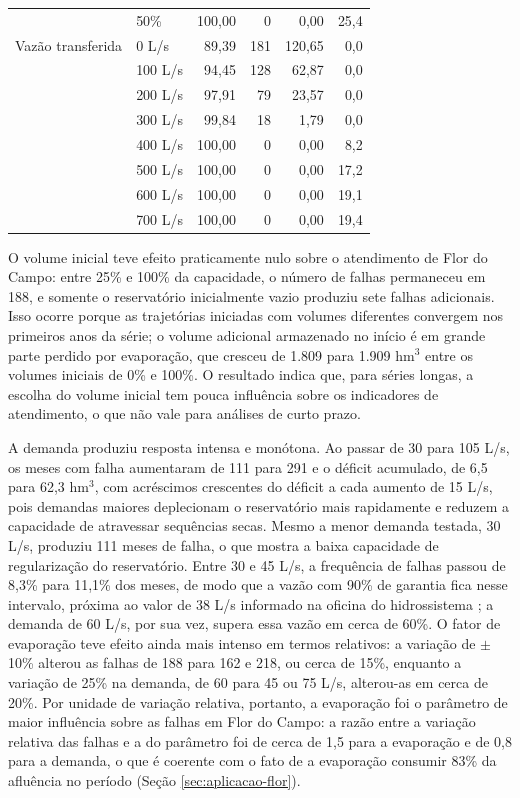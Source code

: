 \begin{table}[H]
\begin{tabular}{llrrrr}
         & 50\% & 100,00 & 0 & 0,00 & 25,4 \\
        Vazão transferida & 0 L/s & 89,39 & 181 & 120,65 & 0,0 \\
         & 100 L/s & 94,45 & 128 & 62,87 & 0,0 \\
         & 200 L/s & 97,91 & 79 & 23,57 & 0,0 \\
         & 300 L/s & 99,84 & 18 & 1,79 & 0,0 \\
         & 400 L/s & 100,00 & 0 & 0,00 & 8,2 \\
         & 500 L/s & 100,00 & 0 & 0,00 & 17,2 \\
         & 600 L/s & 100,00 & 0 & 0,00 & 19,1 \\
         & 700 L/s & 100,00 & 0 & 0,00 & 19,4 \\
        \bottomrule
    \end{tabular}
\end{table}

O volume inicial teve efeito praticamente nulo sobre o atendimento de Flor do Campo: entre 25\% e 100\% da capacidade, o número de falhas permaneceu em 188, e somente o reservatório inicialmente vazio produziu sete falhas adicionais. Isso ocorre porque as trajetórias iniciadas com volumes diferentes convergem nos primeiros anos da série; o volume adicional armazenado no início é em grande parte perdido por evaporação, que cresceu de 1.809 para 1.909 hm$^3$ entre os volumes iniciais de 0\% e 100\%. O resultado indica que, para séries longas, a escolha do volume inicial tem pouca influência sobre os indicadores de atendimento, o que não vale para análises de curto prazo.

A demanda produziu resposta intensa e monótona. Ao passar de 30 para 105 L/s, os meses com falha aumentaram de 111 para 291 e o déficit acumulado, de 6,5 para 62,3 hm$^3$, com acréscimos crescentes do déficit a cada aumento de 15 L/s, pois demandas maiores deplecionam o reservatório mais rapidamente e reduzem a capacidade de atravessar sequências secas. Mesmo a menor demanda testada, 30 L/s, produziu 111 meses de falha, o que mostra a baixa capacidade de regularização do reservatório. Entre 30 e 45 L/s, a frequência de falhas passou de 8,3\% para 11,1\% dos meses, de modo que a vazão com 90\% de garantia fica nesse intervalo, próxima ao valor de 38 L/s informado na oficina do hidrossistema \cite{oficinaFlorDoCampo2026}; a demanda de 60 L/s, por sua vez, supera essa vazão em cerca de 60\%. O fator de evaporação teve efeito ainda mais intenso em termos relativos: a variação de $\pm$10\% alterou as falhas de 188 para 162 e 218, ou cerca de 15\%, enquanto a variação de 25\% na demanda, de 60 para 45 ou 75 L/s, alterou-as em cerca de 20\%. Por unidade de variação relativa, portanto, a evaporação foi o parâmetro de maior influência sobre as falhas em Flor do Campo: a razão entre a variação relativa das falhas e a do parâmetro foi de cerca de 1,5 para a evaporação e de 0,8 para a demanda, o que é coerente com o fato de a evaporação consumir 83\% da afluência no período (Seção \ref{sec:aplicacao-flor}).

